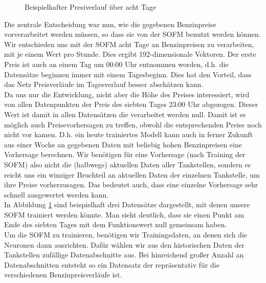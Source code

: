 \documentclass[11pt]{article}
\begin{document}
	
	\begin{figure}
		\centering
		\caption{Beispielhafter Presiverlauf über acht Tage}
		\label{Diagramm Daten}
	\end{figure}
	
	Die zentrale Entscheidung war nun, wie die gegebenen Benzinpreise vorverarbeitet werden müssen, so dass sie von der SOFM benutzt werden können. Wir entschieden uns mit der SOFM acht Tage an Benzinpreisen zu verarbeiten, mit je einem Wert pro Stunde. Dies ergibt 192-dimensionale Vektoren. Der erste Preis ist auch an einem Tag um 00:00 Uhr entnommen worden, d.h. die Datensätze beginnen immer mit einem Tagesbeginn. Dies hat den Vorteil, dass das Netz Preisverläufe im Tagesverlauf besser abschätzen kann.\\
	Da uns nur die Entwicklung, nicht aber die Höhe des Preises interessiert, wird von allen Datenpunkten der Preis des siebten Tages 23:00 Uhr abgezogen. Dieser Wert ist damit in allen Datensätzen die verarbeitet werden null. Damit ist es möglich auch Preisevorhersagen zu treffen, obwohl die entsprechenden Preise noch nicht vor kamen. D.h. ein heute trainiertes Modell kann auch in ferner Zukunft aus einer Woche an gegebenen Daten mit beliebig hohen Benzinpreisen eine Vorhersage berechnen. Wir benötigen für eine Vorhersage (nach Training der SOFM) also nicht die (halbwegs) aktuellen Daten aller Tankstellen, sondern es reicht uns ein winziger Bruchteil an aktuellen Daten der einzelnen Tankstelle, um ihre Preise vorherzusagen. Das bedeutet auch, dass eine einzelne Vorhersage sehr schnell ausgewertet werden kann.\\
	In Abbildung \ref{Diagramm Daten} sind beispielhaft drei Datensätze dargestellt, mit denen unsere SOFM trainiert werden könnte. Man sieht deutlich, dass sie einen Punkt am Ende des siebten Tages mit dem Funktionswert null gemeinsam haben. \\
	Um die SOFM zu trainieren, benötigen wir Trainingsdaten, an denen sich die Neuronen dann ausrichten. Dafür wählen wir aus den historischen Daten der Tankstellen zufällige Datenabschnitte aus. Bei hinreichend großer Anzahl an Datenabschnitten entsteht so ein Datensatz der repräsentativ für die verschiedenen Benzinpreisverläufe ist.\\
	
\end{document}
